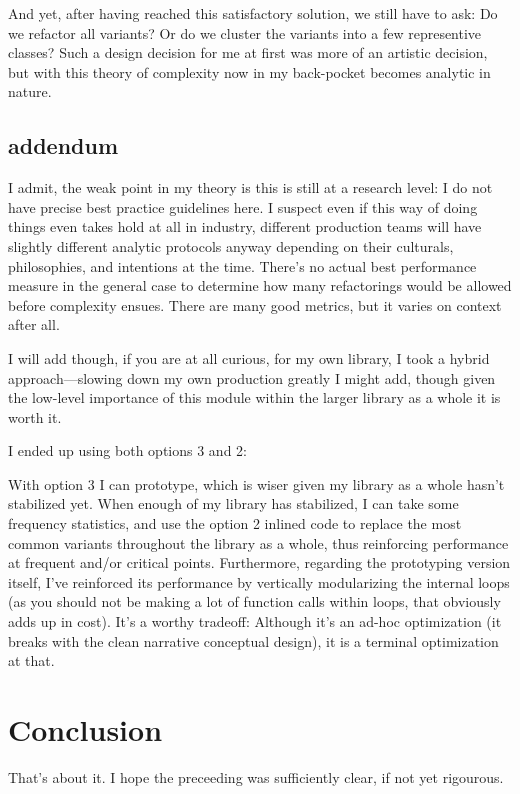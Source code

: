 \documentclass[twoside]{article}
\begin{document}
And yet, after having reached this satisfactory solution, we still have to ask: Do we refactor all variants?
Or do we cluster the variants into a few representive classes? Such a design decision for me at first was more
of an artistic decision, but with this theory of complexity now in my back-pocket becomes analytic in nature.

\subsection*{addendum}

I admit, the weak point in my theory is this is still at a research level: I do not have precise best practice
guidelines here. I suspect even if this way of doing things even takes hold at all in industry, different production
teams will have slightly different analytic protocols anyway depending on their culturals, philosophies, and intentions
at the time. There's no actual best performance measure in the general case to determine how many refactorings
would be allowed before complexity ensues. There are many good metrics, but it varies on context after all.

I will add though, if you are at all curious, for my own library, I took a hybrid approach---slowing down my own
production greatly I might add, though given the low-level importance of this module within the larger library
as a whole it is worth it.

I ended up using both options 3 and 2:

With option 3 I can prototype, which is wiser given my library as a whole hasn't stabilized yet. When enough of my
library has stabilized, I can take some frequency statistics, and use the option 2 inlined code to replace the most
common variants throughout the library as a whole, thus reinforcing performance at frequent and/or critical points.
Furthermore, regarding the prototyping version itself, I've reinforced its performance by vertically modularizing the
internal loops (as you should not be making a lot of function calls within loops, that obviously adds up in cost).
It's a worthy tradeoff: Although it's an ad-hoc optimization (it breaks with the clean narrative conceptual design),
it is a terminal optimization at that.

\section*{Conclusion}

That's about it. I hope the preceeding was sufficiently clear, if not yet rigourous.
\end{document}
